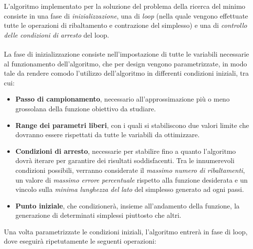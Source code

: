 \documentclass[a4paper, 11pt]{article}
\begin{document}
L'algoritmo implementato per la soluzione del problema della ricerca del minimo
consiste in una fase di \emph{inizializzazione}, una di \emph{loop} (nella quale
vengono effettuate tutte le operazioni di ribaltamento e contrazione del
simplesso) e una di \emph{controllo delle condizioni di arresto} del loop. \\ \\
La fase di inizializzazione consiste nell'impostazione di tutte le variabili
necessarie al funzionamento dell'algoritmo, che per design vengono
parametrizzate, in modo tale da rendere comodo l'utilizzo dell'algoritmo in
differenti condizioni iniziali, tra cui:
\begin{itemize}
\item \textbf{Passo di campionamento}, necessario all'approssimazione più o meno
grossolana della funzione obiettivo da studiare.
\item \textbf{Range dei parametri liberi}, con i quali si stabiliscono due
valori limite che dovranno essere rispettati da tutte le variabili da
ottimizzare.
\item \textbf{Condizioni di arresto}, necessarie per stabilire fino a quanto
l'algoritmo dovrà iterare per garantire dei risultati soddisfacenti. Tra le
innumerevoli condizioni possibili, verranno considerate il \emph{massimo numero
di ribaltamenti}, un valore di \emph{massimo errore percentuale} rispetto alla
funzione desiderata e un vincolo sulla \emph{minima lunghezza del lato} del
simplesso generato ad ogni passi.
\item \textbf{Punto iniziale}, che condizionerà, insieme all'andamento della
funzione, la generazione di determinati simplessi piuttosto che altri.
\end{itemize}

\noindent
Una volta parametrizzate le condizioni iniziali, l'algoritmo entrerà in fase di
loop, dove eseguirà ripetutamente le seguenti operazioni:
\end{document}
